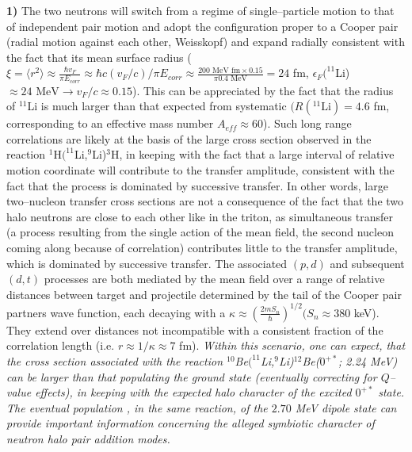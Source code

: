 \begin{subappendices}
    
\textbf{1)} The two neutrons will switch from a regime of single--particle motion to that of independent pair motion and adopt the configuration proper to a Cooper pair (radial motion against each other, Weisskopf) and expand radially consistent with the fact that its mean surface radius ($\xi=\langle r^2\rangle\approx\frac{\hbar v_F}{\pi E_{corr}}\approx \hbar c(v_F/c)/\pi E_{corr}\approx\frac{200\text{ MeV fm}\times 0.15}{\pi 0.4\text{ MeV}}=24$ fm, $\epsilon_F(^{11}$Li)$\approx 24\text{ MeV}\rightarrow v_F/c\approx 0.15$). This can be appreciated by the fact that the radius of $^{11}$Li is much larger than that expected from systematic $(R(^{11}\text{Li})=4.6 $ fm, corresponding to an effective mass number $A_{eff}\approx60$).
    	Such long range correlations are likely at the basis of the large cross section observed in the reaction $^1$H$(^{11}$Li,$^9$Li)$^3$H, in keeping with the fact that a large interval of relative motion coordinate will contribute to the transfer amplitude, consistent with the fact that the process is dominated by successive transfer. In other words, large two--nucleon transfer cross sections are not a consequence of the fact that the two halo neutrons are close to each other like in the triton, as simultaneous transfer (a process resulting from the single action of the mean field, the second nucleon coming along because of correlation) contributes little to the transfer amplitude, which is dominated by successive transfer. The associated $(p,d)$ and subsequent $(d,t)$ processes are both mediated by the mean field over a range of relative distances between target and projectile determined by the tail of the Cooper pair partners wave function, each decaying with a $\kappa\approx\left(\frac{2mS_n}{\hbar}\right)^{1/2} (S_n\approx 380 $ keV). They extend over distances not incompatible with a consistent fraction of the correlation length (i.e. $r\approx1/\kappa\approx 7$ fm).
    	\textit{Within this scenario, one can expect, that the cross section associated with the reaction $^{10}$Be$(^{11}$Li,$^9$Li)$^{12}$Be($0^{+*}$; 2.24 MeV) can be larger than that populating the ground state (eventually correcting for $Q$--value effects), in keeping with the expected halo character of the excited $0^{+*}$ state. The eventual population , in the same reaction, of the $2.70$ MeV dipole state can provide important information concerning the alleged symbiotic character of neutron halo pair addition modes.}
    	

\end{subappendices}
